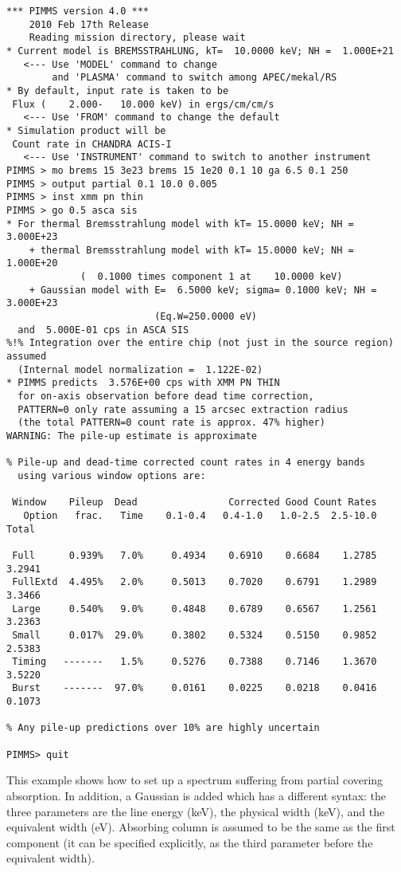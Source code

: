 \documentclass[11pt]{article}
\begin{document}
\begin{verbatim}
*** PIMMS version 4.0 ***
    2010 Feb 17th Release
    Reading mission directory, please wait
* Current model is BREMSSTRAHLUNG, kT=  10.0000 keV; NH =  1.000E+21
   <--- Use 'MODEL' command to change
        and 'PLASMA' command to switch among APEC/mekal/RS
* By default, input rate is taken to be
 Flux (    2.000-   10.000 keV) in ergs/cm/cm/s
   <--- Use 'FROM' command to change the default
* Simulation product will be
 Count rate in CHANDRA ACIS-I
   <--- Use 'INSTRUMENT' command to switch to another instrument
PIMMS > mo brems 15 3e23 brems 15 1e20 0.1 10 ga 6.5 0.1 250
PIMMS > output partial 0.1 10.0 0.005
PIMMS > inst xmm pn thin
PIMMS > go 0.5 asca sis
* For thermal Bremsstrahlung model with kT= 15.0000 keV; NH =  3.000E+23
    + thermal Bremsstrahlung model with kT= 15.0000 keV; NH =  1.000E+20
             (  0.1000 times component 1 at    10.0000 keV)
    + Gaussian model with E=  6.5000 keV; sigma= 0.1000 keV; NH =  3.000E+23
                          (Eq.W=250.0000 eV)
  and  5.000E-01 cps in ASCA SIS
%!% Integration over the entire chip (not just in the source region) assumed
  (Internal model normalization =  1.122E-02)
* PIMMS predicts  3.576E+00 cps with XMM PN THIN
  for on-axis observation before dead time correction,
  PATTERN=0 only rate assuming a 15 arcsec extraction radius
  (the total PATTERN=0 count rate is approx. 47% higher)
WARNING: The pile-up estimate is approximate

% Pile-up and dead-time corrected count rates in 4 energy bands
  using various window options are:

 Window    Pileup  Dead                Corrected Good Count Rates
   Option   frac.   Time    0.1-0.4   0.4-1.0   1.0-2.5  2.5-10.0     Total

 Full      0.939%   7.0%     0.4934    0.6910    0.6684    1.2785      3.2941
 FullExtd  4.495%   2.0%     0.5013    0.7020    0.6791    1.2989      3.3466
 Large     0.540%   9.0%     0.4848    0.6789    0.6567    1.2561      3.2363
 Small     0.017%  29.0%     0.3802    0.5324    0.5150    0.9852      2.5383
 Timing   -------   1.5%     0.5276    0.7388    0.7146    1.3670      3.5220
 Burst    -------  97.0%     0.0161    0.0225    0.0218    0.0416      0.1073

% Any pile-up predictions over 10% are highly uncertain

PIMMS> quit
\end{verbatim}

This example shows how to set up a spectrum suffering from partial
covering absorption.  In addition, a Gaussian is added which has
a different syntax: the three parameters are the line energy (keV),
the physical width (keV), and the equivalent width (eV).  Absorbing
column is assumed to be the same as the first component (it can
be specified explicitly, as the third parameter before the equivalent
width).
\end{document}
